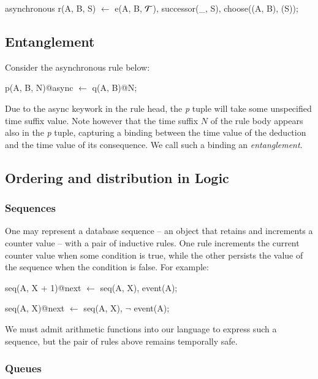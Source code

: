 
\begin{Dedalus}
asynchronous
r(A, B, S) \(\leftarrow\)
   e(A, B, \(\Tau\)), successor(_, S), choose((A, B), (S));
\end{Dedalus}


\subsection{Entanglement}

Consider the asynchronous rule below:

\begin{Dedalus}
p(A, B, N)@async \(\leftarrow\)
  q(A, B)@N;
\end{Dedalus}

Due to the async keywork in the rule head, the \emph{p} tuple will take some unspecified time suffix value.
Note however that the time suffix $N$ of the rule body appears also in the \emph{p} tuple, capturing a 
binding between the time value of the deduction and the time value of its consequence.  We call such a binding
an \emph{entanglement}.   



\subsection{Ordering and distribution in Logic}


\subsubsection{Sequences}

One may represent a database sequence -- an object that retains and increments a counter value -- with a pair of inductive rules.  One rule increments the current counter value when some condition is true, while the other persists the value of the sequence when the condition is false.  For example:

\begin{Dedalus}
seq(A, X + 1)@next \(\leftarrow\) seq(A, X), event(A);
  
seq(A, X)@next \(\leftarrow\) seq(A, X), \(\lnot\) event(A);
\end{Dedalus}

We must admit arithmetic functions into our language to express such a
sequence, but the pair of rules above remains temporally safe.


\subsubsection{Queues}

